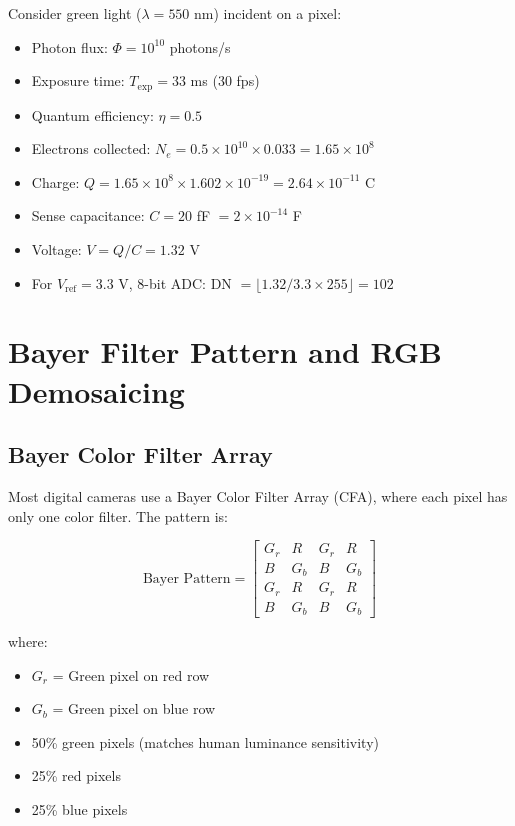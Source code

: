 \documentclass[11pt,a4paper]{article}
\begin{document}
\begin{tcolorbox}[colback=blue!5!white,colframe=blue!75!black,title=Example: Photon to DN Conversion]
Consider green light ($\lambda = 550$ nm) incident on a pixel:
\begin{itemize}
    \item Photon flux: $\Phi = 10^{10}$ photons/s
    \item Exposure time: $T_{\text{exp}} = 33$ ms (30 fps)
    \item Quantum efficiency: $\eta = 0.5$
    \item Electrons collected: $N_e = 0.5 \times 10^{10} \times 0.033 = 1.65 \times 10^8$
    \item Charge: $Q = 1.65 \times 10^8 \times 1.602 \times 10^{-19} = 2.64 \times 10^{-11}$ C
    \item Sense capacitance: $C = 20$ fF $= 2 \times 10^{-14}$ F
    \item Voltage: $V = Q/C = 1.32$ V
    \item For $V_{\text{ref}} = 3.3$ V, 8-bit ADC: DN $= \lfloor 1.32/3.3 \times 255 \rfloor = 102$
\end{itemize}
\end{tcolorbox}

\section{Bayer Filter Pattern and RGB Demosaicing}

\subsection{Bayer Color Filter Array}

Most digital cameras use a Bayer Color Filter Array (CFA), where each pixel has only one color filter. The pattern is:

\begin{equation}
\text{Bayer Pattern} = \begin{bmatrix}
G_r & R & G_r & R \\
B & G_b & B & G_b \\
G_r & R & G_r & R \\
B & G_b & B & G_b
\end{bmatrix}
\end{equation}

where:
\begin{itemize}
    \item $G_r$ = Green pixel on red row
    \item $G_b$ = Green pixel on blue row
    \item 50\% green pixels (matches human luminance sensitivity)
    \item 25\% red pixels
    \item 25\% blue pixels
\end{itemize}
\end{document}
